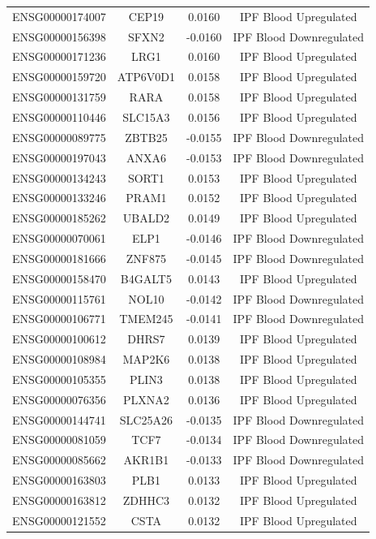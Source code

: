 \documentclass[
]{article}
\begin{document}
\begin{singlespace}
\begin{longtable}[t]{lccc}
ENSG00000174007 & CEP19 & 0.0160 & IPF Blood Upregulated\\
\addlinespace
ENSG00000156398 & SFXN2 & -0.0160 & IPF Blood Downregulated\\
ENSG00000171236 & LRG1 & 0.0160 & IPF Blood Upregulated\\
ENSG00000159720 & ATP6V0D1 & 0.0158 & IPF Blood Upregulated\\
ENSG00000131759 & RARA & 0.0158 & IPF Blood Upregulated\\
ENSG00000110446 & SLC15A3 & 0.0156 & IPF Blood Upregulated\\
\addlinespace
ENSG00000089775 & ZBTB25 & -0.0155 & IPF Blood Downregulated\\
ENSG00000197043 & ANXA6 & -0.0153 & IPF Blood Downregulated\\
ENSG00000134243 & SORT1 & 0.0153 & IPF Blood Upregulated\\
ENSG00000133246 & PRAM1 & 0.0152 & IPF Blood Upregulated\\
ENSG00000185262 & UBALD2 & 0.0149 & IPF Blood Upregulated\\
\addlinespace
ENSG00000070061 & ELP1 & -0.0146 & IPF Blood Downregulated\\
ENSG00000181666 & ZNF875 & -0.0145 & IPF Blood Downregulated\\
ENSG00000158470 & B4GALT5 & 0.0143 & IPF Blood Upregulated\\
ENSG00000115761 & NOL10 & -0.0142 & IPF Blood Downregulated\\
ENSG00000106771 & TMEM245 & -0.0141 & IPF Blood Downregulated\\
\addlinespace
ENSG00000100612 & DHRS7 & 0.0139 & IPF Blood Upregulated\\
ENSG00000108984 & MAP2K6 & 0.0138 & IPF Blood Upregulated\\
ENSG00000105355 & PLIN3 & 0.0138 & IPF Blood Upregulated\\
ENSG00000076356 & PLXNA2 & 0.0136 & IPF Blood Upregulated\\
ENSG00000144741 & SLC25A26 & -0.0135 & IPF Blood Downregulated\\
\addlinespace
ENSG00000081059 & TCF7 & -0.0134 & IPF Blood Downregulated\\
ENSG00000085662 & AKR1B1 & -0.0133 & IPF Blood Downregulated\\
ENSG00000163803 & PLB1 & 0.0133 & IPF Blood Upregulated\\
ENSG00000163812 & ZDHHC3 & 0.0132 & IPF Blood Upregulated\\
ENSG00000121552 & CSTA & 0.0132 & IPF Blood Upregulated\\

\end{longtable}
\end{singlespace}
\end{document}
